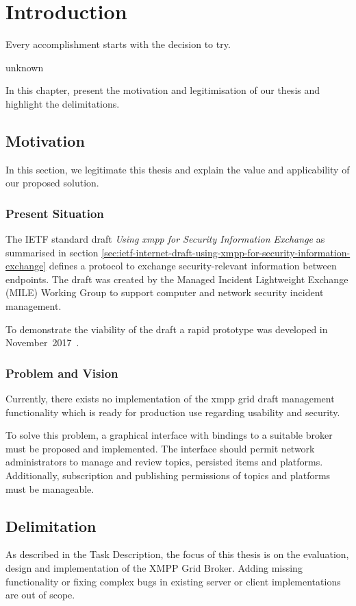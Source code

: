 \newcommand{\code}{\texttt}
\chapter{Introduction}
\label{sec:introduction}

\epigraph{Every accomplishment starts with the decision to try.}{unknown}
In this chapter, present the motivation and legitimisation of our thesis and highlight the delimitations.

\section{Motivation}
In this section, we legitimate this thesis and explain the value and applicability of our proposed solution.

\subsection{Present Situation}
The IETF standard draft \emph{Using \gls{xmpp} for Security Information Exchange} \cite{ietf-mile-xmpp-grid-05} as summarised in section \ref{sec:ietf-internet-draft-using-xmpp-for-security-information-exchange} defines a protocol to exchange security-relevant information between endpoints.
The draft was created by the Managed Incident Lightweight Exchange (MILE) Working Group to support computer and network security incident management.

To demonstrate the viability of the draft a rapid prototype was developed in November~2017~\cite{xmpp-grid-prototype}.

\subsection{Problem and Vision}
Currently, there exists no implementation of the \gls{xmpp} grid draft management functionality which is ready for production use regarding usability and security.

To solve this problem, a graphical interface with bindings to a suitable \gls{broker} must be proposed and implemented.
The interface should permit network administrators to manage and review \glspl{topic}, persisted items and \glspl{platform}.
Additionally, subscription and publishing permissions of \glspl{topic} and \glspl{platform} must be manageable.

\section{Delimitation} %
As described in the Task Description, the focus of this thesis is on the evaluation, design and implementation of the XMPP Grid Broker.
Adding missing functionality or fixing complex bugs in existing server or client implementations are out of scope.
